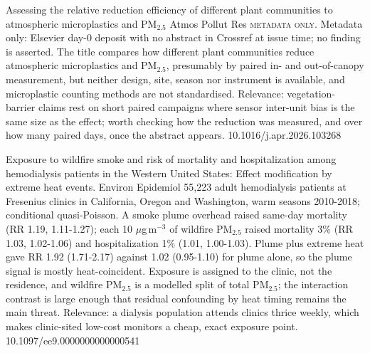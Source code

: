 \documentclass[10pt]{article}
\begin{document}
{Assessing the relative reduction efficiency of different plant communities to atmospheric microplastics and PM$_{2.5}$}
{Atmos Pollut Res}
{\textsc{metadata only.} Metadata only: Elsevier day-0 deposit with no abstract in Crossref at issue time; no finding is asserted. The title compares how different plant communities reduce atmospheric microplastics and PM$_{2.5}$, presumably by paired in- and out-of-canopy measurement, but neither design, site, season nor instrument is available, and microplastic counting methods are not standardised. Relevance: vegetation-barrier claims rest on short paired campaigns where sensor inter-unit bias is the same size as the effect; worth checking how the reduction was measured, and over how many paired days, once the abstract appears.}
{10.1016/j.apr.2026.103268}

\par{}\baselineskip{}\baselineskip
{}

{Exposure to wildfire smoke and risk of mortality and hospitalization among hemodialysis patients in the Western United States: Effect modification by extreme heat events.}
{Environ Epidemiol}
{55,223 adult hemodialysis patients at Fresenius clinics in California, Oregon and Washington, warm seasons 2010-2018; conditional quasi-Poisson. A smoke plume overhead raised same-day mortality (RR 1.19, 1.11-1.27); each 10 $\mu$g\,m$^{-3}$ of wildfire PM$_{2.5}$ raised mortality 3\% (RR 1.03, 1.02-1.06) and hospitalization 1\% (1.01, 1.00-1.03). Plume plus extreme heat gave RR 1.92 (1.71-2.17) against 1.02 (0.95-1.10) for plume alone, so the plume signal is mostly heat-coincident. Exposure is assigned to the clinic, not the residence, and wildfire PM$_{2.5}$ is a modelled split of total PM$_{2.5}$; the interaction contrast is large enough that residual confounding by heat timing remains the main threat. Relevance: a dialysis population attends clinics thrice weekly, which makes clinic-sited low-cost monitors a cheap, exact exposure point.}
{10.1097/ee9.0000000000000541}
\end{document}

